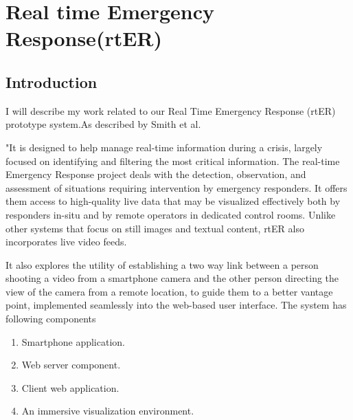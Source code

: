 \chapter{Real time Emergency Response(rtER) }
\label{chap:figtab}

\section{Introduction}

I will describe my work related to our Real Time Emergency Response (rtER) prototype system.As described by Smith et al. 
\begin{munquote}
"It is designed to help manage real-time information during a crisis, largely focused on identifying and filtering the most critical information. The real-time Emergency Response project deals with the detection, observation, and assessment of situations requiring intervention by emergency responders. It offers them access to high-quality live data that may be visualized effectively both by responders in-situ and by remote operators in dedicated control rooms.
Unlike other systems that focus on still images and textual content, rtER also incorporates live video feeds.
\end{munquote}
 It also explores the utility of establishing a two way link between a person shooting a video from a smartphone camera and the other person directing the view of the camera from a remote location, to guide them to a better vantage point, implemented seamlessly into the web-based
user interface. The system has following components
\begin{enumerate}
	\item Smartphone application.
	\item Web server component.
	\item Client web application.
	\item An immersive visualization environment.
\end{enumerate}\cite{rter2013}

